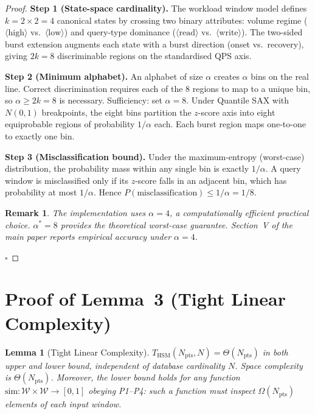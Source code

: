 \documentclass[10pt,twocolumn,a4paper]{article}
\newtheorem{lemma}{Lemma}
\newtheorem{remark}{Remark}
\newcommand{\Npts}{N_{\mathrm{pts}}}
\begin{document}
\begin{proof}
\textbf{Step 1 (State-space cardinality).}
The workload window model defines $k=2\times2=4$ canonical states by
crossing two binary attributes: volume regime
($\langle\mathrm{high}\rangle$ vs.\ $\langle\mathrm{low}\rangle$) and
query-type dominance ($\langle\mathrm{read}\rangle$ vs.\
$\langle\mathrm{write}\rangle$). The two-sided burst extension augments
each state with a burst direction (onset vs.\ recovery), giving
$2k=8$ discriminable regions on the standardised QPS axis.

\textbf{Step 2 (Minimum alphabet).}
An alphabet of size $\alpha$ creates $\alpha$ bins on the real line.
Correct discrimination requires each of the 8 regions to map to a
unique bin, so $\alpha\geq2k=8$ is necessary. Sufficiency: set
$\alpha=8$. Under Quantile SAX with $N(0,1)$ breakpoints, the eight
bins partition the $z$-score axis into eight equiprobable regions of
probability $1/\alpha$ each. Each burst region maps one-to-one to
exactly one bin.

\textbf{Step 3 (Misclassification bound).}
Under the maximum-entropy (worst-case) distribution, the probability
mass within any single bin is exactly $1/\alpha$. A query window is
misclassified only if its $z$-score falls in an adjacent bin, which
has probability at most $1/\alpha$. Hence
$P(\mathrm{misclassification})\leq1/\alpha=1/8$.

\begin{remark}
The implementation uses $\alpha=4$, a computationally efficient
practical choice. $\alpha^{*}=8$ provides the theoretical worst-case
guarantee. Section~V of the main paper reports empirical accuracy
under $\alpha=4$.
\end{remark}
\hfill$\square$
\end{proof}

\section{Proof of Lemma~3 (Tight Linear Complexity)}

\begin{lemma}[Tight Linear Complexity]
$T_{\mathrm{HSM}}(\Npts,N)=\Theta(\Npts)$ in both upper and lower
bound, independent of database cardinality $N$. Space complexity is
$\Theta(\Npts)$. Moreover, the lower bound holds for any function
$\mathrm{sim}:\mathcal{W}\!\times\!\mathcal{W}\!\to\![0,1]$ obeying
P1--P4: such a function must inspect $\Omega(\Npts)$ elements of each
input window.
\end{lemma}
\end{document}
